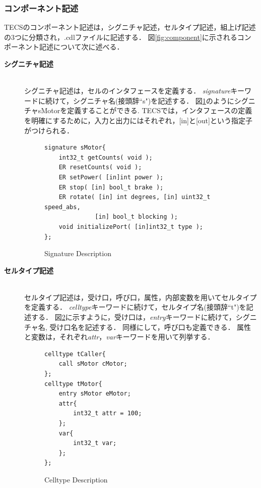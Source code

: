 \documentclass[submit]{ipsj_v2/UTF8/ipsj}
\begin{document}
\subsubsection{コンポーネント記述}
TECSのコンポーネント記述は，シグニチャ記述，セルタイプ記述，組上げ記述の3つに分類され，.cdlファイルに記述する．
図\ref{fig:component}に示されるコンポーネント記述について次に述べる．
\begin{description}
    \item[{\bf シグニチャ記述}]\mbox{}\\
        シグニチャ記述は，セルのインタフェースを定義する．
        {\it signature}キーワードに続けて，シグニチャ名(接頭辞``s")を記述する．
        図\ref{signature}のようにシグニチャsMotorを定義することができる.
        TECSでは，インタフェースの定義を明確にするために，入力と出力にはそれぞれ，[in]と[out]という指定子がつけられる．
        
\begin{figure}[t]
\centering
\begin{lstlisting}
signature sMotor{
    int32_t getCounts( void );
    ER resetCounts( void );
    ER setPower( [in]int power );
    ER stop( [in] bool_t brake );
    ER rotate( [in] int degrees, [in] uint32_t speed_abs,
              [in] bool_t blocking );
    void initializePort( [in]int32_t type );
};
\end{lstlisting}
\caption{Signature Description}
\label{signature}
\end{figure}

    \item[{\bf セルタイプ記述}]\mbox{}\\
        セルタイプ記述は，受け口，呼び口，属性，内部変数を用いてセルタイプを定義する．
        {\it celltype}キーワードに続けて，セルタイプ名(接頭辞``t")を記述する．
        図\ref{celltype}に示すように，受け口は，{\it entry}キーワードに続けて，シグニチャ名, 受け口名を記述する．
        同様にして，呼び口も定義できる．
        属性と変数は，それぞれ{\it attr}，{\it var}キーワードを用いて列挙する．

\begin{figure}[t]
\centering
\begin{lstlisting}
celltype tCaller{
    call sMotor cMotor;
};
celltype tMotor{
    entry sMotor eMotor;
    attr{
        int32_t attr = 100;
    };
    var{
        int32_t var;
    };
};
\end{lstlisting}
\caption{Celltype Description}
\label{celltype}
\end{figure}


\end{description}
\end{document}
